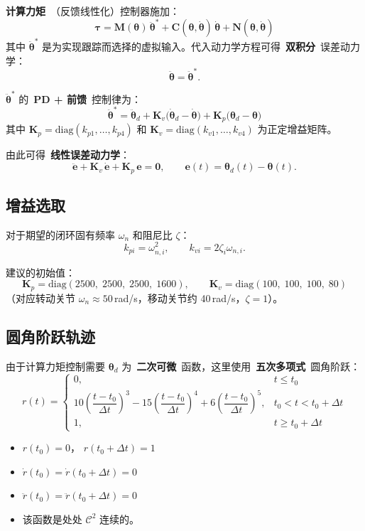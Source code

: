 \documentclass[12pt,a4paper]{ctexart}
\begin{document}
\textbf{计算力矩}\ （反馈线性化）控制器施加：
\[
\boxed{\bm{\tau} = \mathbf{M}(\bm{\theta})\,\ddot{\bm{\theta}}^* + \mathbf{C}(\bm{\theta},\dot{\bm{\theta}})\,\dot{\bm{\theta}} + \mathbf{N}(\bm{\theta},\dot{\bm{\theta}})}
\]
其中 $\ddot{\bm{\theta}}^*$ 是为实现跟踪而选择的虚拟输入。代入动力学方程可得\ \textbf{双积分}\ 误差动力学：
\[
\ddot{\bm{\theta}} = \ddot{\bm{\theta}}^*.
\]

$\ddot{\bm{\theta}}^*$ 的\ \textbf{PD + 前馈}\ 控制律为：
\[
\boxed{\ddot{\bm{\theta}}^* = \ddot{\bm{\theta}}_d + \mathbf{K}_v\bigl(\dot{\bm{\theta}}_d - \dot{\bm{\theta}}\bigr) + \mathbf{K}_p\bigl(\bm{\theta}_d - \bm{\theta}\bigr)}
\]
其中 $\mathbf{K}_p = \mathrm{diag}(k_{p1},\ldots,k_{p4})$ 和 $\mathbf{K}_v = \mathrm{diag}(k_{v1},\ldots,k_{v4})$ 为正定增益矩阵。

由此可得\ \textbf{线性误差动力学}：
\[
\ddot{\mathbf{e}} + \mathbf{K}_v\,\dot{\mathbf{e}} + \mathbf{K}_p\,\mathbf{e} = \mathbf{0},
\qquad \mathbf{e}(t) = \bm{\theta}_d(t) - \bm{\theta}(t).
\]

\subsection{增益选取}

对于期望的闭环固有频率 $\omega_n$ 和阻尼比 $\zeta$：
\[
k_{pi} = \omega_{n,i}^2,\qquad k_{vi} = 2\zeta_i\omega_{n,i}.
\]

建议的初始值：
\[
\mathbf{K}_p = \mathrm{diag}(2500,\;2500,\;2500,\;1600),\qquad
\mathbf{K}_v = \mathrm{diag}(100,\;100,\;100,\;80)
\]
（对应转动关节 $\omega_n \approx 50$\,rad/s，移动关节约 40\,rad/s，$\zeta=1$）。

\subsection{圆角阶跃轨迹}

由于计算力矩控制需要 $\bm{\theta}_d$ 为\ \textbf{二次可微}\ 函数，这里使用\ \textbf{五次多项式}\ 圆角阶跃：
\[
r(t) = \begin{cases}
0, & t \le t_0 \\[3pt]
10\left(\dfrac{t-t_0}{\Delta t}\right)^3 - 15\left(\dfrac{t-t_0}{\Delta t}\right)^4 + 6\left(\dfrac{t-t_0}{\Delta t}\right)^5, & t_0 < t < t_0+\Delta t \\[3pt]
1, & t \ge t_0 + \Delta t
\end{cases}
\]

\begin{conceptbox}[五次圆角阶跃函数的性质]
\begin{itemize}
  \item $r(t_0) = 0$， $r(t_0+\Delta t) = 1$
  \item $\dot{r}(t_0) = \dot{r}(t_0+\Delta t) = 0$
  \item $\ddot{r}(t_0) = \ddot{r}(t_0+\Delta t) = 0$
  \item 该函数是处处 $\mathcal{C}^2$ 连续的。
\end{itemize}
\end{conceptbox}
\end{document}
